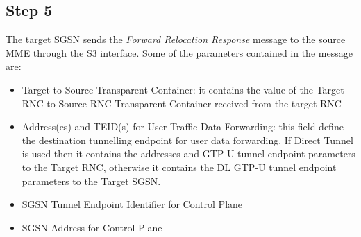 





\subsection*{Step 5}
The target SGSN sends the \emph{Forward Relocation Response} message
to the source MME through the S3 interface. Some of the parameters contained in
the message are:
\begin{itemize}
 \item Target to Source Transparent Container: it contains the value of the
 Target RNC to Source RNC Transparent Container received from the target RNC
 \item Address(es) and TEID(s) for User Traffic Data Forwarding: this field
 define the destination tunnelling endpoint for user data forwarding. If Direct Tunnel
 is used then it contains the addresses and GTP-U tunnel endpoint parameters
 to the Target RNC, otherwise it contains the DL GTP-U tunnel endpoint parameters
 to the Target SGSN.
 \item SGSN Tunnel Endpoint Identifier for Control Plane
 \item SGSN Address for Control Plane
\end{itemize}




